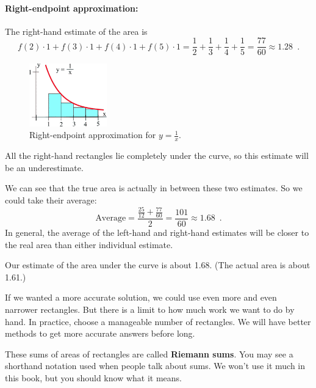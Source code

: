 \begin{example}
\begin{solution}
\paragraph{Right-endpoint approximation:} The right-hand estimate of the area is
$$f(2) \cdot 1 + f(3) \cdot 1 + f(4) \cdot 1 + f(5) \cdot 1 = \frac{1}{2} + \frac{1}{3} + \frac{1}{4} + \frac{1}{5} = \frac{77}{60} \approx   1.28 \enspace .$$
\begin{figure}[!ht]
  \centering
    \includegraphics[width=0.3\textwidth]{img/chap5/image009.png}
    \caption{Right-endpoint approximation for $y=\frac{1}{x}$.}
    \label{fig:5-2-rightex}
\end{figure}
All the right-hand rectangles lie completely under the curve, so this estimate will be an underestimate.

We can see that the true area is actually in between these two estimates. So we could take their average:
$$\text{Average} = \dfrac{\frac{25}{12} + \frac{77}{60}}{2} = \frac{101}{60}\approx   1.68 \enspace .$$
In general, the average of the left-hand and right-hand estimates will be closer to the real area than either individual estimate.

Our estimate of the area under the curve is about 1.68. (The actual area is about 1.61.)

\end{solution}\end{example}


If we wanted a more accurate solution, we could use even more and even narrower rectangles. But there is a limit to how much work we want to do by hand. In practice, choose a manageable number of rectangles. We will have better methods to get more accurate answers before long.

These sums of areas of rectangles are called {\bf Riemann sums}. You may see a shorthand notation used when people talk about sums. We won't use it much in this book, but you should know what it means.

